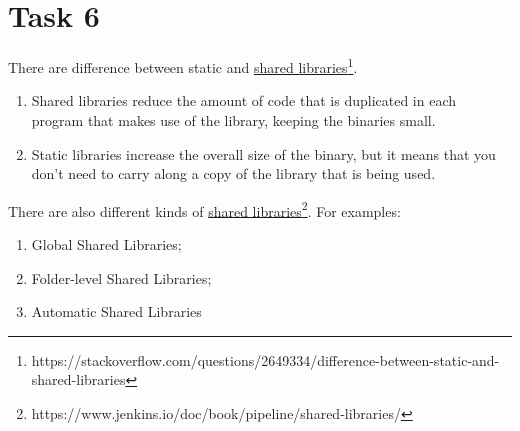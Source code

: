 \documentclass{article}
\begin{document}
\section*{Task 6}
There are difference between static and \href{https://stackoverflow.com/questions/2649334/difference-between-static-and-shared-libraries}{shared libraries}\footnote{https://stackoverflow.com/questions/2649334/difference-between-static-and-shared-libraries}. 
	\begin{enumerate}
	\item Shared libraries reduce the amount of code that is duplicated in each program that makes use of the library, keeping the binaries small.
	\item Static libraries increase the overall size of the binary, but it means that you don't need to carry along a copy of the library that is being used.
	\end{enumerate}
There are also different kinds of \href{https://www.jenkins.io/doc/book/pipeline/shared-libraries/}{shared libraries}\footnote{https://www.jenkins.io/doc/book/pipeline/shared-libraries/}. For examples:
\begin{enumerate}
	\item Global Shared Libraries;
	\item Folder-level Shared Libraries;
	\item Automatic Shared Libraries
	\end{enumerate}
\end{document}
